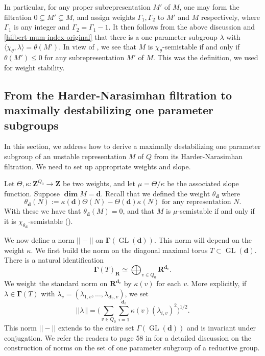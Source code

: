 \documentclass[a4paper]{amsart}
\numberwithin{equation}{section}
\theoremstyle{plain}
\theoremstyle{definition}
\DeclareMathOperator{\GL}{GL}
\begin{document}
In particular, for any proper subrepresentation $M'$ of $M$, one may form the filtration $0\subsetneq M' \subsetneq M$, and assign weights $\Gamma_1,\Gamma_2$ to $M'$ and $M$ respectively, where $\Gamma_1$ is any integer and $\Gamma_2=\Gamma_1-1$.  It then follows from the above discussion and \cref{hilbert-mum-index-original} that there is a one parameter subgroup $\lambda$ with $\langle\chi_{\theta},\lambda\rangle=\theta(M')$. In view of , we see that $M$ is $\chi_{\theta}$-semistable if and only if $\theta(M')\leq 0$ for any subrepresentation $M'$ of $M$. This was the definition,  we used for weight stability.

\subsection{From the Harder-Narasimhan filtration to maximally destabilizing one parameter subgroups}\label{the_complete_proof_of_thmB}
In this section, we address how to derive a maximally destabilizing one parameter subgroup of an unstable representation $M$ of $Q$ from its Harder-Narasimhan filtration. We need to set up appropriate weights and slope.

Let $\Theta,\kappa:\mathbf{Z}^{Q_0}\rightarrow\mathbf{Z}$ be two weights, and let $\mu=\Theta/\kappa$ be the associated slope function. Suppose $\pmb{\dim}M=\mathbf{d}.$ Recall that we defined the weight $\theta_{\mathbf{d}}$ where 
$$\theta_{\mathbf{d}}(N):=\kappa(\mathbf{d})\Theta(N)-\Theta(\mathbf{d})\kappa(N)\text{ for any representation }N.$$ With  these we have that $\theta_{\mathbf{d}}(M)=0$, and that $M$ is $\mu$-semistable if and only if it is $\chi_{\theta_{\mathbf{d}}}$-semistable ().

We now define a norm $||-||$ on $\pmb{\Gamma}(\GL(\mathbf{d}))$. This norm will depend on the weight $\kappa$. We first build the norm on the diagonal maximal torus $T\subset \GL(\mathbf{d})$. There is a natural identification $$\pmb{\Gamma}(T)_{\mathbf{R}}\simeq \bigoplus_{v\in Q_0}\mathbf{R}^{\mathbf{d}_v}.$$ We weight the standard norm on $\mathbf{R}^{\mathbf{d}_v}$ by $\kappa(v)$ for each $v$. More explicitly, if $\lambda\in \pmb{\Gamma}(T)$ with $\lambda_v=(\lambda_{1,v},\ldots,\lambda_{\mathbf{d}_v,v})$, we set  \begin{equation}\label{weighted_norm}||\lambda||=\big(\sum_{v\in Q_0}\sum_{i=1}^{\mathbf{d}_v}\kappa(v)(\lambda_{i,v})^{2}\big)^{1/2}.\end{equation} This norm $||-||$ extends to the entire set $\Gamma(\GL(\mathbf{d}))$ and is invariant under conjugation. We refer the readers to page 58 in \cite{MR1304906} for a detailed discussion on the construction of norms on the set of one parameter subgroup of a reductive group. 
\end{document}
